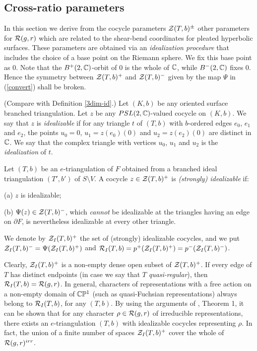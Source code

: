 \subsection {Cross-ratio parameters}\label{Ipar}
In this section we derive from the cocycle parameters
${\mathcal Z}(T,b)^\pm$ other parameters for ${\mathcal R}(g,r)$ which are related
to the shear-bend coordinates for pleated hyperbolic surfaces.
These parameters are obtained via an {\it idealization procedure}
that includes the choice of a base point on the Riemann sphere. We
fix this base point as $0$. Note that the $B^+(2,{\mathbb C})$-orbit of $0$
is the whole of ${\mathbb C}$, while $B^-(2,{\mathbb C})$ fixes $0$. Hence the
symmetry between ${\mathcal Z}(T,b)^+$ and ${\mathcal Z}(T,b)^-$ given by the map
$\Psi$ in (\ref{convert}) shall be broken.
\begin{defi} \label{triideal-pre} {\rm
(Compare with Definition \ref{3dim-id}.) Let $(K,b)$ be any oriented
surface branched triangulation. Let $z$ be any $PSL(2,{\mathbb C})$-valued
cocycle on $(K,b)$.  We say that $z$ is {\it idealizable} if for any
triangle $t$ of $(T,b)$ with $b$-ordered edges $e_0$, $e_1$ and $e_2$,
the points $u_0=0$, $u_1= z(e_0)(0)$ and $u_2= z(e_2)(0)$ are distinct
in $\mathbb{C}$. We say that the complex triangle with vertices $u_0$, $u_1$
and $u_2$ is the \emph{idealization} of $t$.}
\end{defi}
\begin{defi} \label{triideal}
{\rm Let $(T,b)$ be an $e$-triangulation of $F$ obtained from a
branched ideal triangulation $(T',b')$ of $S \setminus V$. A
cocycle $z\in {\mathcal Z}(T,b)^+$ is {\it (strongly) idealizable} if:
\smallskip

(a) $z$ is idealizable;
\smallskip

(b) $\Psi(z) \in {\mathcal Z}(T,b)^-$, which {\it cannot} be idealizable at the
triangles having an edge on $\partial F$, is nevertheless idealizable
at every other triangle.
\smallskip

We denote by ${\mathcal Z}_I(T,b)^+$ the set of (strongly) idealizable
cocycles, and we put ${\mathcal Z}_I(T,b)^- = \Psi({\mathcal Z}_I(T,b)^+)$ and
${\mathcal R}_I(T,b) = p^+({\mathcal Z}_I(T,b)^+) = p^-({\mathcal Z}_I(T,b)^- )$.}
\end{defi}

Clearly, ${\mathcal Z}_I(T,b)^+$ is a non-empty dense open subset of
${\mathcal Z}(T,b)^+$. If every edge of $T$ has distinct endpoints (in case
we say that $T$ {\it quasi-regular}), then ${\mathcal R}_I(T,b) =
{\mathcal R}(g,r)$. In general, characters of representations with a free
action on a non-empty domain of $\mathbb{C}\mathbb{P}^1$ (such as
quasi-Fuchsian representations) always belong to ${\mathcal R}_I(T,b)$, for
any $(T,b)$. By using the arguments of \cite{Kmod}, Theorem 1, it
can be shown that for any character $\rho\in {\mathcal R}(g,r)$ of
irreducible representations, there exists an $e$-triangulation
$(T,b)$ with idealizable cocycles representing $\rho$. In fact,
the union of a finite number of spaces ${\mathcal Z}_I(T,b)^+$ cover the
whole of ${\mathcal R}(g,r)^{irr}$.


